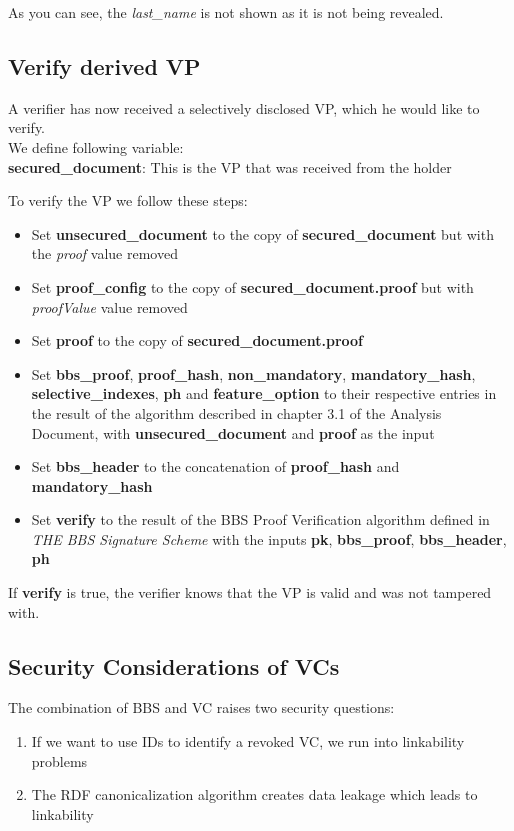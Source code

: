 \documentclass[
	a4paper               %
	,bibliography=totoc   %
	,listof=totoc         %
	,monolingual
	twoside=false,
]{bfhthesis}              %
\begin{document}
As you can see, the \textit{last\_name} is not shown as it is not being revealed.

\subsection{Verify derived VP}
\label{subsub:verifyvp}
A verifier has now received a selectively disclosed VP, which he would like to verify.\\

We define following variable:\\
\textbf{secured\_document}: This is the VP that was received from the holder\newpage

To verify the VP we follow these steps:
\begin{itemize}
	\item Set \textbf{unsecured\_document} to the copy of \textbf{secured\_document} but with the \textit{proof} value removed
	\item Set \textbf{proof\_config} to the copy of \textbf{secured\_document.proof} but with \textit{proofValue} value removed
	\item Set \textbf{proof} to the copy of \textbf{secured\_document.proof}
	\item Set \textbf{bbs\_proof}, \textbf{proof\_hash}, \textbf{non\_mandatory}, \textbf{mandatory\_hash}, \textbf{selective\_indexes}, \textbf{ph} and \textbf{feature\_option} to their respective entries in the result of the algorithm described in chapter 3.1 of the Analysis Document, with \textbf{unsecured\_document} and \textbf{proof} as the input
	\item Set \textbf{bbs\_header} to the concatenation of \textbf{proof\_hash} and \textbf{mandatory\_hash}
	\item Set \textbf{verify} to the result of the BBS Proof Verification algorithm defined in \textit{THE BBS Signature Scheme}\cite{bbs-signature-scheme} with the inputs \textbf{pk}, \textbf{bbs\_proof}, \textbf{bbs\_header}, \textbf{ph}
\end{itemize}

If \textbf{verify} is true, the verifier knows that the VP is valid and was not tampered with. 

\subsection{Security Considerations of VCs}
\label{subsec:vcseccons}
The combination of BBS and VC raises two security questions:
\begin{enumerate}
	\item If we want to use IDs to identify a revoked VC, we run into linkability problems
	\item The RDF canonicalization algorithm creates data leakage which leads to linkability
\end{enumerate}
\end{document}
